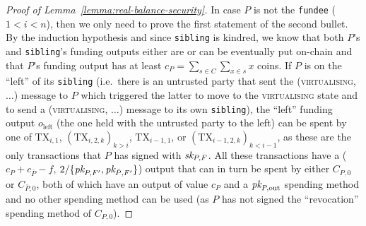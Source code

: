 \begin{proof}[Proof of Lemma~\ref{lemma:real-balance-security}]
  In case $P$ is not the \texttt{fundee} ($1<i<n$), then we only need to prove
  the first statement of the second bullet. By the induction hypothesis and
  since \texttt{sibling} is kindred, we know that both $P$'s and
  \texttt{sibling}'s funding outputs either are or can be eventually put
  on-chain and that $P$'s funding output has at least $c_P = \sum\limits_{s \in
  C} \sum\limits_{x \in s} x$ coins. If $P$ is on the ``left'' of its
  \texttt{sibling} (i.e.\ there is an untrusted party that sent the
  (\textsc{virtualising}, $\dots$) message to $P$ which triggered the latter to
  move to the \textsc{virtualising} state and to send a (\textsc{virtualising},
  $\dots$) message to its own \texttt{sibling}), the ``left'' funding output
  $o_{\mathrm{left}}$ (the one held with the untrusted party to the left) can be
  spent by one of $\mathrm{TX}_{i, 1}$, $(\mathrm{TX}_{i, 2, k})_{k > i}$,
  $\mathrm{TX}_{i-1, 1}$, or $(\mathrm{TX}_{i-1, 2, k})_{k < i-1}$, as these are
  the only transactions that $P$ has signed with $\textit{sk}_{P, F}$. All these
  transactions have a ($c_P + c_{\bar{P}} - f$, $2/\{\textit{pk}_{P, F'}, \textit{pk}_{\bar{P},
  F'}\}$) output that can in turn be spent by either $C_{P, 0}$ or $C_{\bar{P},
  0}$, both of which have an output of value $c_P$ and a $\textit{pk}_{P, \mathrm{out}}$
  spending method and no other spending method can be used (as $P$ has not
  signed the ``revocation'' spending method of $C_{P, 0}$).


\end{proof}
